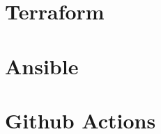 \documentclass[a4paper]{article}
\begin{document}
    \newpage
    \section{Terraform}
    \subsection{}
    \subsection{}
    
    \newpage
    \section{Ansible}
    \subsection{}
    \subsection{}

    \newpage
    \section{Github Actions}
    \subsection{}
    \subsection{}
\end{document}
